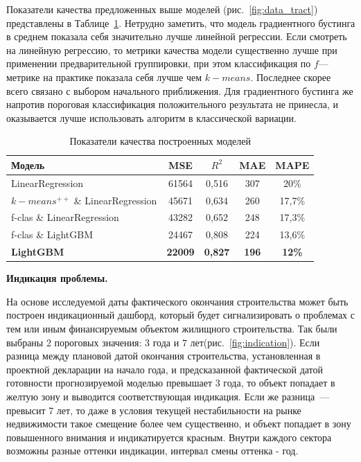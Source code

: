 \documentclass[12pt,a4paper]{article} %
\begin{document}
Показатели качества предложенных выше моделей (рис.~\ref{fig:data_tract}) представлены в Таблице~\ref{Tab:3}. Нетрудно заметить, что модель градиентного бустинга в среднем показала себя значительно лучше линейной регрессии. Если смотреть на линейную регрессию, то метрики качества модели существенно лучше при применении предварительной группировки, при этом классификация по $f$---метрике
на практике показала себя лучше чем $k-means$. Последнее скорее всего связано с выбором начального приближения. Для градиентного бустинга же напротив пороговая классификация положительного результата не принесла, и оказывается лучше использовать алгоритм в классической вариации. 
\begin{table}[h]
	\centering
	\begin{tabular}{lcccc}
		
		\hline  Модель& MSE &  $R^2$ & MAE & MAPE \\
		\hline LinearRegression  & 61564 & 0,516 & 307 & 20\%\\
		$k-means^{++}$ \& LinearRegression  & 45671 & 0,634 & 260& 17,7\%\\
		f-clas \& LinearRegression & 43282 & 0,652 & 248 & 17,3\%\\
		f-clas \& LightGBM & 24467 &  0,808 & 224 & 13,6\%\\
		\hline
		\textbf{LightGBM}&  \textbf{22009}& \textbf{0,827}& \textbf{196}&
		\textbf{12\%}   \\
		\hline 
	\end{tabular}
	
	\caption{Показатели качества построенных моделей}
	\label{Tab:3}
\end{table}

\textbf{Индикация проблемы.} 

На основе исследуемой даты фактического окончания строительства может быть построен индикационный дашборд, который будет сигнализировать о проблемах с тем или иным финансируемым объектом жилищного строительства. 
Так были выбраны 2 пороговых значения: $3$ года и $7$ лет(рис.~\ref{fig:indication}). Если разница между плановой датой окончания строительства, установленная в проектной декларации на начало года, и предсказанной фактической датой готовности прогнозируемой моделью превышает 3 года, то объект попадает в желтую зону и выводится соответствующая индикация. Если же разница~--- превысит 7 лет, то даже в условия текущей нестабильности на рынке недвижимости такое смещение более чем существенно, и объект попадает в зону повышенного внимания и индикатируется красным. Внутри каждого сектора возможны разные оттенки индикации, интервал смены оттенка - год.
\end{document}
